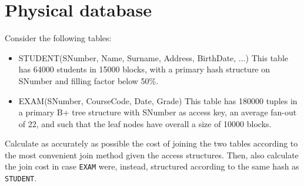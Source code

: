 \section{Physical database}

Consider the following tables: 
\begin{itemize}
    \item STUDENT(SNumber, Name, Surname, Address, BirthDate, $\dots$)
        This table has 64000 students in 15000 blocks, with a primary hash structure on SNumber and filling factor below 50\%. 
    \item EXAM(SNumber, CourseCode, Date, Grade)
        This table has 180000 tuples in a primary B+ tree structure with SNumber as access key, an average fan-out of 22, and such that the leaf nodes have overall a size of 10000 blocks. 
\end{itemize}
Calculate as accurately as possible the cost of joining the two tables according to the most convenient join method given the access structures.
Then, also calculate the join cost in case \texttt{EXAM} were, instead, structured according to the same hash as \texttt{STUDENT}.

